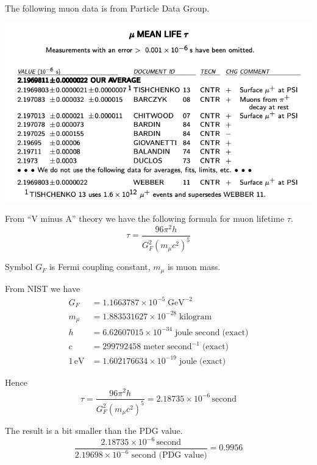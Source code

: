 \documentclass[12pt]{article}
\begin{document}
\noindent
The following muon data is from Particle Data Group.%

\begin{center}
\includegraphics[scale=0.5]{muon-mean-life.png}
\end{center}

\noindent
From ``V minus A'' theory we have the following formula for muon lifetime $\tau$.
\begin{equation*}
\tau=\frac{96\pi^2h}{G_F^2\left(m_\mu c^2\right)^5}
\end{equation*}

\noindent
Symbol $G_F$ is Fermi coupling constant, $m_\mu$ is muon mass.

\bigskip
\noindent
From NIST we have
\begin{align*}
G_F&=1.1663787\times10^{-5}\;\text{GeV}^{-2}
\\
m_\mu&=1.883531627\times10^{-28}\;\text{kilogram}
\\
h&=6.62607015\times10^{-34}\;\text{joule}\;\text{second}\;\text{(exact)}
\\
c&=299792458\;\text{meter}\;\text{second}^{-1}\;\text{(exact)}
\\
1\,\text{eV}&=1.602176634\times10^{-19}\;\text{joule}\;\text{(exact)}
\end{align*}

\noindent
Hence
\begin{equation*}
\tau=\frac{96\pi^2h}{G_F^2\left(m_\mu c^2\right)^5}
=2.18735\times10^{-6}\,\text{second}
\end{equation*}

\noindent
The result is a bit smaller than the PDG value.
\begin{equation*}
\frac{2.18735\times10^{-6}\,\text{second}}{2.19698\times10^{-6}\;\text{second (PDG value)}}=0.9956
\end{equation*}
\end{document}

